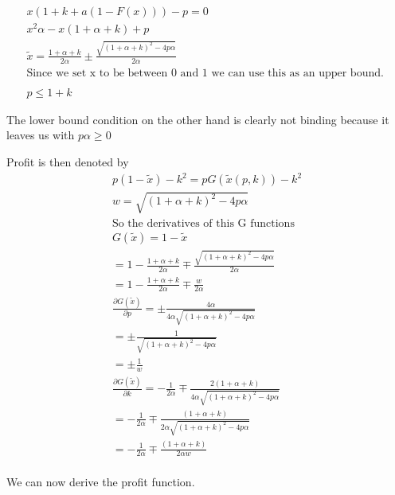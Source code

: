 \documentclass{article}
\begin{document}
\begin{align*}
x(1+k+a(1-F(x))) -p = 0 \\
x^2 \alpha-x(1+\alpha+k) +p \\
\tilde{x} 
= \frac{1+\alpha+k}{2\alpha}
\pm \frac{\sqrt{\left(1+\alpha+k \right)^2-4p\alpha}}{2\alpha} \\
\text{Since we set x to be between 0 and 1 we can use this as an upper bound. } \\
\\
p  \leq 1 +k
\end{align*}

The lower bound condition on the other hand is clearly not binding because it leaves us with $p\alpha \geq 0$

Profit is then denoted by 
\begin{align*}
p(1-\tilde{x}) - k^2 = pG(\tilde{x}(p,k)) - k^2 \\
w = \sqrt{\left(1+\alpha+k \right)^2-4p\alpha} \\
\text{So the derivatives of this G functions} \\
G(\tilde{x}) = 1-\tilde{x} 
\\
=1-\frac{1+\alpha+k}{2\alpha}
\mp \frac{\sqrt{\left(1+\alpha+k \right)^2-4p\alpha}}{2\alpha}
\\
=1-\frac{1+\alpha+k}{2\alpha}
\mp \frac{w}{2\alpha}
\\
\frac{\partial G(\tilde{x})}{\partial p} = \pm \frac{4\alpha}{4 \alpha \sqrt{\left(1+\alpha+k \right)^2-4p\alpha}}
\\
= \pm \frac{1}{ \sqrt{\left(1+\alpha+k \right)^2-4p \alpha}}
\\
= \pm \frac{1}{w}
\\
\frac{\partial G(\tilde{x})}{\partial k} = -\frac{1}{2\alpha}
\mp \frac{2 \left(1+\alpha+k \right)}{4\alpha\sqrt{\left(1+\alpha+k \right)^2-4p\alpha}} \\
= -\frac{1}{2\alpha}
\mp \frac{\left(1+\alpha+k \right)}{2 \alpha\sqrt{\left(1+\alpha+k \right)^2-4p\alpha}} \\
= -\frac{1}{2\alpha}
\mp \frac{\left(1+\alpha+k \right)}{2 \alpha w} \\
\end{align*}

We can now derive the profit function. 
\end{document}
